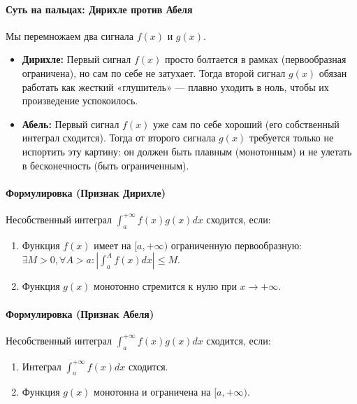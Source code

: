 \paragraph{Суть на пальцах: Дирихле против Абеля}
Мы перемножаем два сигнала $f(x)$ и $g(x)$.
\begin{itemize}
    \item \textbf{Дирихле:} Первый сигнал $f(x)$ просто болтается в рамках (первообразная ограничена), но сам по себе не затухает. Тогда второй сигнал $g(x)$ обязан работать как жесткий «глушитель» — плавно уходить в ноль, чтобы их произведение успокоилось.
    \item \textbf{Абель:} Первый сигнал $f(x)$ уже сам по себе хороший (его собственный интеграл сходится). Тогда от второго сигнала $g(x)$ требуется только не испортить эту картину: он должен быть плавным (монотонным) и не улетать в бесконечность (быть ограниченным).
\end{itemize}

\paragraph{Формулировка (Признак Дирихле)}
Несобственный интеграл $\int_a^{+\infty} f(x)g(x) dx$ сходится, если:
\begin{enumerate}
    \item Функция $f(x)$ имеет на $[a, +\infty)$ ограниченную первообразную: $\exists M > 0, \forall A > a : \left| \int_a^A f(x) dx \right| \le M$.
    \item Функция $g(x)$ монотонно стремится к нулю при $x \to +\infty$.
\end{enumerate}

\paragraph{Формулировка (Признак Абеля)}
Несобственный интеграл $\int_a^{+\infty} f(x)g(x) dx$ сходится, если:
\begin{enumerate}
    \item Интеграл $\int_a^{+\infty} f(x) dx$ сходится.
    \item Функция $g(x)$ монотонна и ограничена на $[a, +\infty)$.
\end{enumerate}

